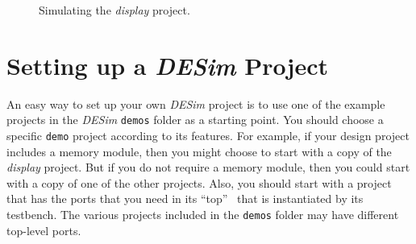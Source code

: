 \begin{figure}[t]
	\begin{center}
        \setlength{\fboxsep}{0pt}
	\end{center}
          \caption{Simulating the {\it display} project.}
	\label{fig:sim3}
\end{figure}

\section{Setting up a {\it DESim} Project}

An easy way to set up your own {\it DESim} project is to use one of the example projects in
the {\it DESim} \texttt{demos} folder as a starting point. You should choose a specific 
\texttt{demo} project according to its features. 
For example, if your design project includes a memory module, then you might choose to start 
with a copy of the {\it display} project. But if you do not require a memory module, then 
you could start with a copy of one of the other projects. Also, you should start
with a project that has the ports that you need in its ``top'' \hdlModuleName~that is instantiated by
its testbench. The various projects included in the \texttt{demos} folder 
may have different top-level ports. 

